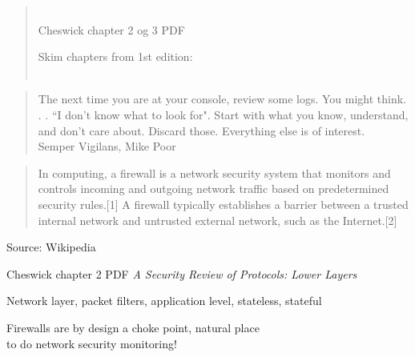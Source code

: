 \documentclass[Screen16to9,17pt]{foils}
\begin{document}

\begin{quote}
\\
 Cheswick chapter 2 og 3 PDF
\item Skim chapters from 1st edition:\\
\\ 
\end{quote}

\begin{quote}
The next time you are at your console, review some logs. You might think. . . “I don’t know what to look for". Start with what you know, understand, and don’t care about. Discard those. Everything else is of interest.\\
Semper Vigilans,
Mike Poor
\end{quote}




\begin{quote}
In computing, a firewall is a network security system that monitors and controls incoming and outgoing network traffic based on predetermined security rules.[1] A firewall typically establishes a barrier between a trusted internal network and untrusted external network, such as the Internet.[2]
\end{quote} Source: Wikipedia 

\begin{list1}

\item Cheswick chapter 2 PDF
\emph{A Security Review of Protocols:
Lower Layers}\\
\begin{list2}
\item Network layer, packet filters, application level, stateless, stateful
\end{list2}
\end{list1}

Firewalls are by design a choke point, natural place \\
to do network security monitoring!



\end{document}
